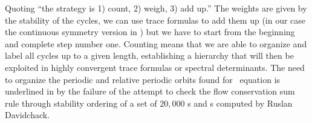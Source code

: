 Quoting  ``the strategy is 1) count, 2) weigh,
3) add up.'' The weights are given by the stability of the
cycles, we can use trace formulas to add them up (in our case
the continuous symmetry version in ) but we have to
start from the beginning and complete step number one. Counting
means that we are able to organize and label all cycles up to a
given length, establishing a hierarchy that will then be
exploited in highly convergent trace formulas or spectral
determinants. The need to organize the periodic and relative
periodic orbits found for \KS\ equation is underlined in
 by the failure of the attempt to check the
flow conservation sum rule through stability ordering of a set
of $20,000$ {\po s} and {\rpo s} computed by Ruslan Davidchack.

